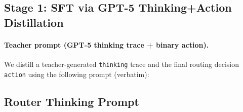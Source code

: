 \documentclass{article}
\theoremstyle{plain}
\theoremstyle{definition}
\theoremstyle{remark}
\begin{document}
\subsection{Stage 1: SFT via GPT-5 Thinking+Action Distillation}
\label{app:router_sft}

\paragraph{Teacher prompt (GPT-5 thinking trace + binary action).}
We distill a teacher-generated \texttt{thinking} trace and the final routing decision \texttt{action} using the following prompt (verbatim):

\subsection{Router Thinking Prompt}
\label{app:router_prompt_v2}
\end{document}
